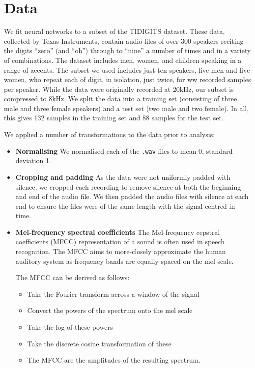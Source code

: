 \section{Data} \label{sec:data}
We fit neural networks to a subset of the TIDIGITS dataset. These data, collected by Texas Instruments, contain audio files of over 300 speakers reciting the digits ``zero'' (and ``oh'') through to ``nine'' a number of times and in a variety of combinations. The dataset includes men, women, and children speaking in a range of accents. The subset we used includes just ten speakers, five men and five women, who repeat each of digit, in isolation, just twice, for ww recorded samples per speaker. While the data were originally recorded at 20kHz, our subset is compressed to 8kHz. We split the data into a training set (consisting of three male and three female speakers) and a test set (two male and two female). In all, this gives 132 samples in the training set and 88 samples for the test set.

 

We applied a number of transformations to the data prior to analysis:
\begin{itemize}
\item \textbf{Normalising} We normalised each of the \texttt{.wav} files to mean 0, standard deviation 1.

\item \textbf{Cropping and padding} As the data were not uniformly padded with silence, we cropped each recording to remove silence at both the beginning and end of the audio file. We then padded the audio files with silence at each end to ensure the files were of the same length with the signal centred in time.

\item \textbf{Mel-frequency spectral coefficients}
The Mel-frequency cepstral coefficients (MFCC) representation of a sound is often used in speech recognition. The MFCC aims to more-closely approximate the human auditory system as frequency bands are equally spaced on the mel scale. 

The MFCC can be derived as follows:
\begin{itemize}
\item Take the Fourier transform across a window of the signal
\item Convert the powers of the spectrum onto the mel scale
\item Take the log of these powers
\item Take the discrete cosine transformation of these
\item The MFCC are the amplitudes of the resulting spectrum.
\end{itemize}
\end{itemize}



